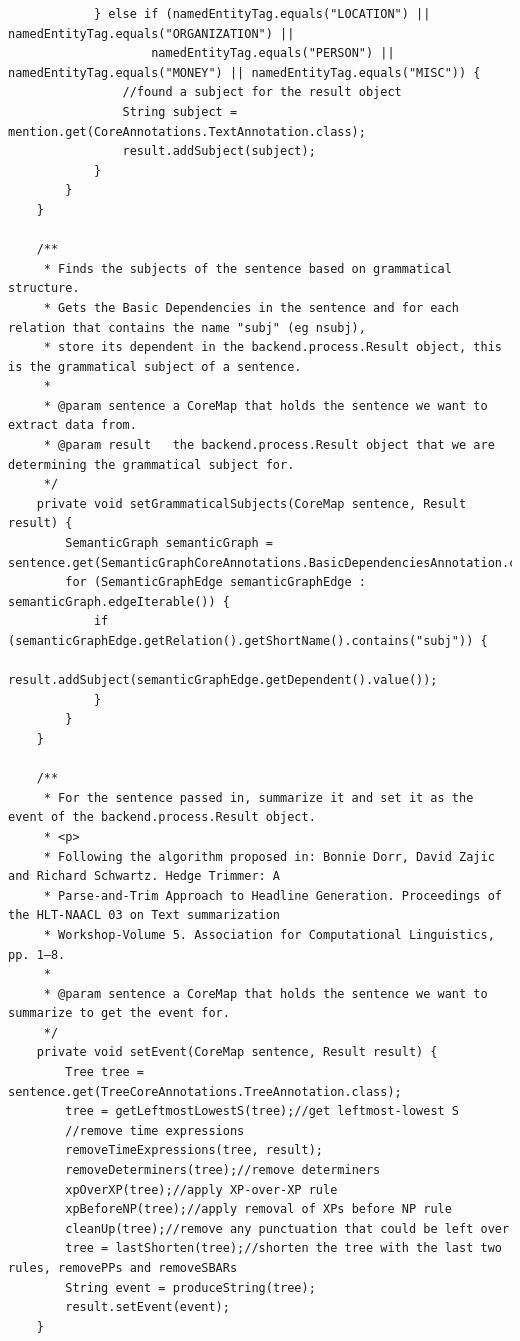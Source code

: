 \begin{lstlisting}
            } else if (namedEntityTag.equals("LOCATION") || namedEntityTag.equals("ORGANIZATION") ||
                    namedEntityTag.equals("PERSON") || namedEntityTag.equals("MONEY") || namedEntityTag.equals("MISC")) {
                //found a subject for the result object
                String subject = mention.get(CoreAnnotations.TextAnnotation.class);
                result.addSubject(subject);
            }
        }
    }

    /**
     * Finds the subjects of the sentence based on grammatical structure.
     * Gets the Basic Dependencies in the sentence and for each relation that contains the name "subj" (eg nsubj),
     * store its dependent in the backend.process.Result object, this is the grammatical subject of a sentence.
     *
     * @param sentence a CoreMap that holds the sentence we want to extract data from.
     * @param result   the backend.process.Result object that we are determining the grammatical subject for.
     */
    private void setGrammaticalSubjects(CoreMap sentence, Result result) {
        SemanticGraph semanticGraph = sentence.get(SemanticGraphCoreAnnotations.BasicDependenciesAnnotation.class);
        for (SemanticGraphEdge semanticGraphEdge : semanticGraph.edgeIterable()) {
            if (semanticGraphEdge.getRelation().getShortName().contains("subj")) {
                result.addSubject(semanticGraphEdge.getDependent().value());
            }
        }
    }

    /**
     * For the sentence passed in, summarize it and set it as the event of the backend.process.Result object.
     * <p>
     * Following the algorithm proposed in: Bonnie Dorr, David Zajic and Richard Schwartz. Hedge Trimmer: A
     * Parse-and-Trim Approach to Headline Generation. Proceedings of the HLT-NAACL 03 on Text summarization
     * Workshop-Volume 5. Association for Computational Linguistics, pp. 1–8.
     *
     * @param sentence a CoreMap that holds the sentence we want to summarize to get the event for.
     */
    private void setEvent(CoreMap sentence, Result result) {
        Tree tree = sentence.get(TreeCoreAnnotations.TreeAnnotation.class);
        tree = getLeftmostLowestS(tree);//get leftmost-lowest S
        //remove time expressions
        removeTimeExpressions(tree, result);
        removeDeterminers(tree);//remove determiners
        xpOverXP(tree);//apply XP-over-XP rule
        xpBeforeNP(tree);//apply removal of XPs before NP rule
        cleanUp(tree);//remove any punctuation that could be left over
        tree = lastShorten(tree);//shorten the tree with the last two rules, removePPs and removeSBARs
        String event = produceString(tree);
        result.setEvent(event);
    }


\end{lstlisting}
